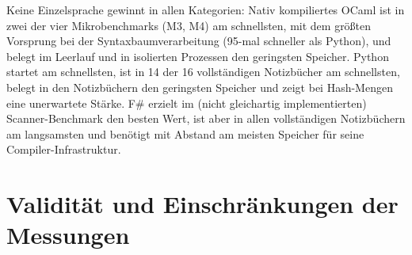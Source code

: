 Keine Einzelsprache gewinnt in allen Kategorien:
Nativ kompiliertes OCaml ist in zwei der vier Mikrobenchmarks (M3, M4) am schnellsten, mit dem größten Vorsprung bei der Syntaxbaumverarbeitung (95-mal schneller als Python), und belegt im Leerlauf und in isolierten Prozessen den geringsten Speicher.
Python startet am schnellsten, ist in 14 der 16 vollständigen Notizbücher am schnellsten, belegt in den Notizbüchern den geringsten Speicher und zeigt bei Hash-Mengen eine unerwartete Stärke.
F\# erzielt im (nicht gleichartig implementierten) Scanner-Benchmark den besten Wert, ist aber in allen vollständigen Notizbüchern am langsamsten und benötigt mit Abstand am meisten Speicher für seine Compiler-Infrastruktur.

\section{Validität und Einschränkungen der Messungen}
\label{sec:perf_validity}

